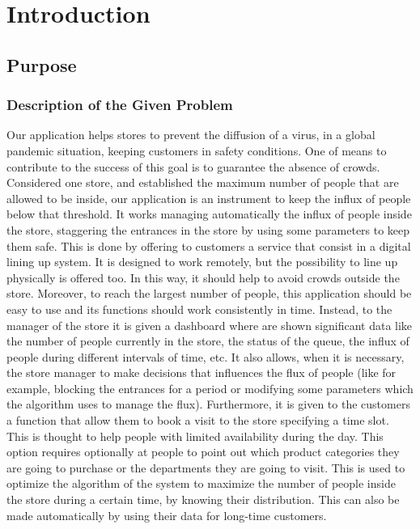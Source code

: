 \chapter{Introduction}

\section{Purpose}

\subsection{Description of the Given Problem}

Our application helps stores to prevent the diffusion of a virus, in a global pandemic situation, keeping customers in safety conditions.
One of means to contribute to the success of this goal is to guarantee the absence of crowds.
Considered one store, and established the maximum number of people that are allowed to be inside, our application is an instrument to keep the influx of people below that threshold.
It works managing automatically the influx of people inside the store, staggering the entrances in the store by using some parameters to keep them safe.
This is done by offering to customers a service that consist in a digital lining up system. It is designed to work remotely, but the possibility to line up physically is offered too. In this way, it should help to avoid crowds outside the store.
Moreover, to reach the largest number of people, this application should be easy to use and its functions should work consistently in time. 
Instead, to the manager of the store it is given a dashboard where are shown significant data like the number of people currently in the store, the status of the queue, the influx of people during different intervals of time, etc. It also allows, when it is necessary, the store manager to make decisions that influences the flux of people (like for example, blocking the entrances for a period or modifying some parameters which the algorithm uses to manage the flux). 
Furthermore, it is given to the customers a function that allow them to book a visit to the store specifying a time slot. This is thought to help people with limited availability during the day.
This option requires optionally at people to point out which product categories they are going to purchase or the departments they are going to visit. This is used to optimize the algorithm of the system to maximize the number of people inside the store during a certain time, by knowing their distribution. This can also be made automatically by using their data for long-time customers.


